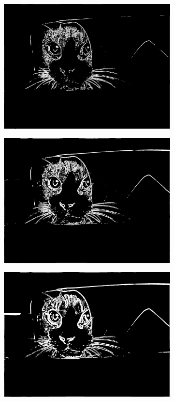 \documentclass[a4paper]{article}
\begin{document}
\begin{figure}[h]
\begin{subfigure}{0.33\textwidth}
\includegraphics[width=\textwidth]{img/sigma1/catst.png}
\end{subfigure}
\begin{subfigure}{0.33\textwidth}
\includegraphics[width=\textwidth]{img/sigma2/catst.png}
\end{subfigure}
\begin{subfigure}{0.33\textwidth}
\includegraphics[width=\textwidth]{img/sigma3/catst.png}

\end{subfigure}
\end{figure}
\end{document}
